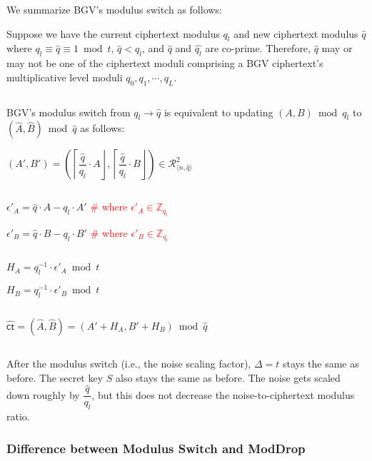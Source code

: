 $ $

We summarize BGV's modulus switch as follows:



\begin{tcolorbox}[title={\textbf{\tboxlabel{\ref*{subsec:bgv-modulus-switch}} BGV's Modulus Switch}}]

Suppose we have the current ciphertext modulus $q_l$ and new ciphertext modulus $\hat{q}$ where $q_l \equiv \hat{q} \equiv 1 \bmod t$, $\hat{q} < q_l$, and $\hat{q}$ and $\hat{q_l}$ are co-prime. Therefore, $\hat{q}$ may or may not be one of the ciphertext moduli comprising a BGV ciphertext's multiplicative level moduli $q_0, q_1, \cdots, q_L$.

$ $

BGV's modulus switch from $q_l \rightarrow \hat{q}$ is equivalent to updating $(A, B) \bmod q_l$ to $(\hat A, \hat B) \bmod \hat{q}$ as follows:


$(A', B') = \left(\left\lceil\dfrac{\hat{q}}{q_l}\cdot A\right\rfloor, \left\lceil\dfrac{\hat{q}}{q_l}\cdot B\right\rfloor\right) \in \mathcal{R}_{\langle n, \hat{q} \rangle}^2$

$ $

$\epsilon'_A = \hat{q}\cdot A - q_l\cdot A'$ \textcolor{red}{ \# where $\epsilon'_A \in \mathbb{Z}_{q_l}$}

$\epsilon'_B = \hat{q}\cdot B - q_l\cdot B'$ \textcolor{red}{ \# where $\epsilon'_B \in \mathbb{Z}_{q_l}$}


$ $

$H_A = q_l^{-1}\cdot\epsilon'_A \bmod t$

$H_B = q_l^{-1}\cdot\epsilon'_B \bmod t$

$ $

$\hat{\textsf{ct}} = (\hat{A}, \hat{B}) = (A' + H_A, B' + H_B) \bmod \hat{q}$

$ $

After the modulus switch (i.e., the noise scaling factor), $\Delta = t$ stays the same as before. The secret key $S$ also stays the same as before. The noise gets scaled down roughly by $\dfrac{\hat{q}}{q_l}$, but this does not decrease the noise-to-ciphertext modulus ratio. 

\end{tcolorbox}



\subsubsection{Difference between Modulus Switch and \textsf{ModDrop}}
\label{subsubsec:bgv-moddrop-vs-modswitch}

